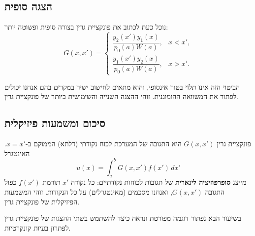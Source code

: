 \subsection*{הצגה סופית}

נוכל כעת לכתוב את פונקציית גרין בצורה סופית ופשוטה יותר:
\[
G(x, x') = \begin{cases}
\dfrac{y_2(x') y_1(x)}{p_0(a) W(a)}, & x < x', \\[10pt]
\dfrac{y_1(x') y_2(x)}{p_0(a) W(a)}, & x > x'.
\end{cases}
\]

הביטוי הזה אינו תלוי בטור אינסופי, והוא מתאים לחישוב ישיר במקרים בהם אנחנו יכולים לפתור את המשוואה ההומוגנית. זוהי ההצגה השנייה והשימושית ביותר של פונקציית גרין.

\subsection*{סיכום ומשמעות פיזיקלית}

פונקציית גרין \(G(x, x')\) היא התגובה של המערכת לכוח נקודתי (דלתא) הממוקם ב-\(x = x'\). האינטגרל
\[
u(x) = \int_a^b G(x, x') f(x') \, dx'
\]
מייצג \textbf{סופרפוזיציה לינארית} של תגובות לכוחות נקודתיים: כל נקודה \(x'\) תורמת \(f(x')\) כפול התגובה \(G(x, x')\), ואנחנו מסכמים (מאינטגרלים) על כל הנקודות. זוהי המשמעות הפיזיקלית של פונקציית גרין.

בשיעור הבא נפתור דוגמה מפורטת ונראה כיצד להשתמש בשתי ההצגות של פונקציית גרין לפתרון בעיות קונקרטיות.
